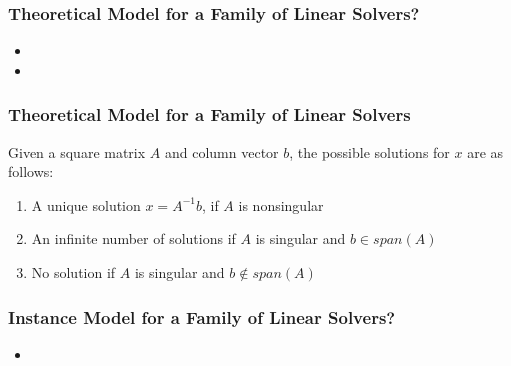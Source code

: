\documentclass[t,12pt,numbers,fleqn]{beamer}
\begin{document}

\begin{frame}
\frametitle{Theoretical Model for a Family of Linear Solvers?}

\begin{itemize}
	
\item {}
\item {}
    
\end{itemize}

\end{frame}


\begin{frame}
\frametitle{Theoretical Model for a Family of Linear Solvers}

Given a square matrix $A$ and column vector $b$, the possible
solutions for $x$ are as follows:

\begin{enumerate}
\item A unique solution $x = A^{-1} b$, if $A$ is nonsingular
\item An infinite number of solutions if $A$ is singular and $b \in span(A)$
\item No solution if $A$ is singular and $b \notin span(A)$
\end{enumerate}

\end{frame}


\begin{frame}
\frametitle{Instance Model for a Family of Linear Solvers?}

\begin{itemize}
	
\item {}
    
\end{itemize}


\end{frame}

\end{document}
